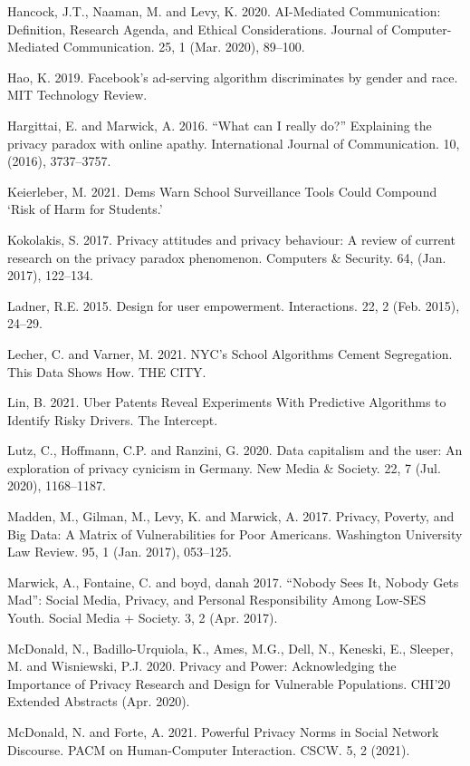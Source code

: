 \documentclass[11pt,dvipdfm]{article}
\begin{document}
\begin{thebibliography}{10}
\begin{small}
Hancock, J.T., Naaman, M. and Levy, K. 2020. AI-Mediated Communication: Definition, Research Agenda, and Ethical Considerations. Journal of Computer-Mediated Communication. 25, 1 (Mar. 2020), 89–100.

Hao, K. 2019. Facebook’s ad-serving algorithm discriminates by gender and race. MIT Technology Review.

Hargittai, E. and Marwick, A. 2016. “What can I really do?” Explaining the privacy paradox with online apathy. International Journal of Communication. 10, (2016), 3737–3757.

Keierleber, M. 2021. Dems Warn School Surveillance Tools Could Compound ‘Risk of Harm for Students.’

Kokolakis, S. 2017. Privacy attitudes and privacy behaviour: A review of current research on the privacy paradox phenomenon. Computers \& Security. 64, (Jan. 2017), 122–134. 

Ladner, R.E. 2015. Design for user empowerment. Interactions. 22, 2 (Feb. 2015), 24–29. 

Lecher, C. and Varner, M. 2021. NYC’s School Algorithms Cement Segregation. This Data Shows How. THE CITY.

Lin, B. 2021. Uber Patents Reveal Experiments With Predictive Algorithms to Identify Risky Drivers. The Intercept.

Lutz, C., Hoffmann, C.P. and Ranzini, G. 2020. Data capitalism and the user: An exploration of privacy cynicism in Germany. New Media \& Society. 22, 7 (Jul. 2020), 1168–1187. 

Madden, M., Gilman, M., Levy, K. and Marwick, A. 2017. Privacy, Poverty, and Big Data: A Matrix of Vulnerabilities for Poor Americans. Washington University Law Review. 95, 1 (Jan. 2017), 053–125.

Marwick, A., Fontaine, C. and boyd,  danah 2017. “Nobody Sees It, Nobody Gets Mad”: Social Media, Privacy, and Personal Responsibility Among Low-SES Youth. Social Media + Society. 3, 2 (Apr. 2017).

McDonald, N., Badillo-Urquiola, K., Ames, M.G., Dell, N., Keneski, E., Sleeper, M. and Wisniewski, P.J. 2020. Privacy and Power: Acknowledging the Importance of Privacy Research and Design for Vulnerable Populations. CHI’20 Extended Abstracts (Apr. 2020).

McDonald, N. and Forte, A. 2021. Powerful Privacy Norms in Social Network Discourse. PACM on Human-Computer Interaction. CSCW. 5, 2 (2021).


\end{small}
\end{thebibliography}
\end{document}

